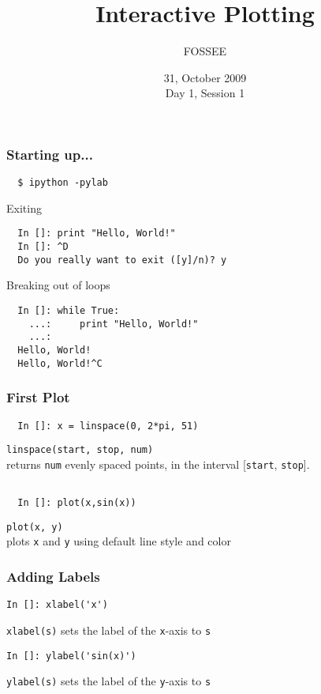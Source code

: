 \documentclass[14pt,compress]{beamer}
\title[]{Interactive Plotting}
\author[FOSSEE] {FOSSEE}
\institute[IIT Bombay] {Department of Aerospace Engineering\\IIT Bombay}
\date[] {31, October 2009\\Day 1, Session 1}
\newcommand{\typ}[1]{\lstinline{#1}}
\begin{document}
\begin{frame}
  \maketitle
\end{frame}



\begin{frame}[fragile]
\frametitle{Starting up...}
\begin{verbatim}
  $ ipython -pylab  
\end{verbatim}
Exiting
\begin{lstlisting}     
  In []: print "Hello, World!"
  In []: ^D
  Do you really want to exit ([y]/n)? y
\end{lstlisting}
Breaking out of loops
\begin{lstlisting}     
  In []: while True:
    ...:     print "Hello, World!"
    ...:     
  Hello, World!
  Hello, World!^C
\end{lstlisting}
\end{frame}

\begin{frame}[fragile]
\frametitle{First Plot}
\begin{lstlisting}
  In []: x = linspace(0, 2*pi, 51)
\end{lstlisting}
\typ{linspace(start, stop, num)} \\
returns \typ{num} evenly spaced points, in the interval [\typ{start}, \typ{stop}].
\begin{lstlisting}

  In []: plot(x,sin(x))
\end{lstlisting}
\typ{plot(x, y)}\\
plots \typ{x} and \typ{y} using default line style and color
\end{frame}

\begin{frame}[fragile]
\frametitle{Adding Labels}
  \begin{lstlisting}
In []: xlabel('x')
  \end{lstlisting}
\typ{xlabel(s)} sets the label of the \typ{x}-axis to \typ{s}

  \begin{lstlisting}
In []: ylabel('sin(x)')
  \end{lstlisting}
\typ{ylabel(s)} sets the label of the \typ{y}-axis to \typ{s}
\end{frame}
\end{document}
